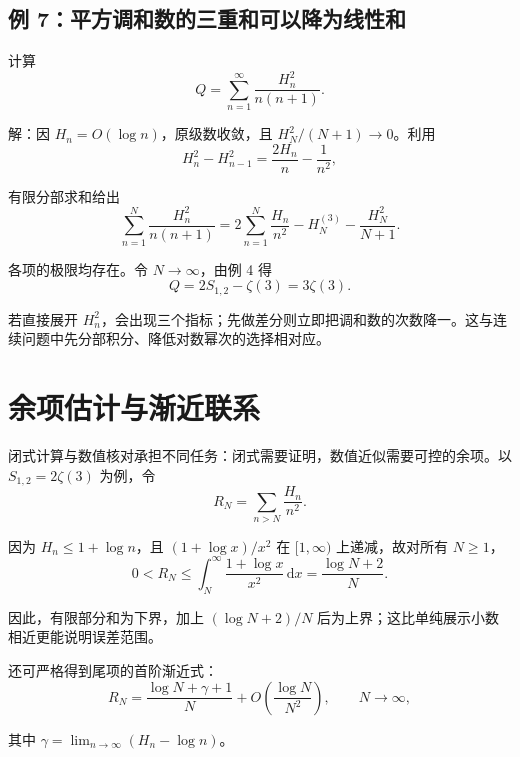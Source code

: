 \documentclass[11pt,a4paper]{article}
\begin{document}
\hypertarget{sec-8-2}{%
\subsection{例 7：平方调和数的三重和可以降为线性和}\label{sec-8-2}}

计算
\[
Q=\sum_{n=1}^{\infty}\frac{H_n^2}{n(n+1)}.
\]

\noindent

解：因 \(H_n=O(\log n)\)，原级数收敛，且 \(H_N^2/(N+1)\to0\)。利用
\[
H_n^2-H_{n-1}^2
=\frac{2H_n}{n}-\frac1{n^2},
\]

有限分部求和给出
\[
\sum_{n=1}^{N}\frac{H_n^2}{n(n+1)}
=2\sum_{n=1}^{N}\frac{H_n}{n^2}
-H_N^{(3)}-\frac{H_N^2}{N+1}.
\]

各项的极限均存在。令 \(N\to\infty\)，由例 4 得
\[
Q=2S_{1,2}-\zeta(3)=3\zeta(3).
\]

若直接展开 \(H_n^2\)，会出现三个指标；先做差分则立即把调和数的次数降一。这与连续问题中先分部积分、降低对数幂次的选择相对应。

\hypertarget{sec-9}{%
\section{余项估计与渐近联系}\label{sec-9}}

闭式计算与数值核对承担不同任务：闭式需要证明，数值近似需要可控的余项。以 \(S_{1,2}=2\zeta(3)\) 为例，令
\[
R_N=\sum_{n>N}\frac{H_n}{n^2}.
\]

因为 \(H_n\leqslant1+\log n\)，且 \((1+\log x)/x^2\) 在 \([1,\infty)\) 上递减，故对所有 \(N\geqslant1\)，
\[
0<R_N\leqslant\int_N^\infty\frac{1+\log x}{x^2}\,\mathrm dx
=\frac{\log N+2}{N}.
\]

因此，有限部分和为下界，加上 \((\log N+2)/N\) 后为上界；这比单纯展示小数相近更能说明误差范围。

还可严格得到尾项的首阶渐近式：
\[
R_N=\frac{\log N+\gamma+1}{N}
+O\!\left(\frac{\log N}{N^2}\right),
\qquad N\to\infty,
\]

其中 \(\gamma=\lim_{n\to\infty}(H_n-\log n)\)。
\end{document}
